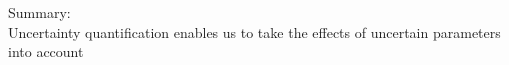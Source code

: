 \documentclass[presentation]{beamer}
\begin{document}
\begin{frame}{{\normalsize Summary:} \\ Uncertainty quantification enables us to take the
  effects of uncertain parameters into account}
  \pause

\end{frame}

























\end{document}
